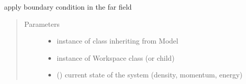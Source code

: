 \documentclass[letterpaper,10pt,english]{sphinxmanual}
\begin{document}
\begin{fulllineitems}
\begin{fulllineitems}
\begin{quote}
\begin{description}
\end{description}
\end{quote}

\end{fulllineitems}


\begin{fulllineitems}
\label{\detokenize{autoapi/BoundaryConditioner/index:BoundaryConditioner.BoundaryConditioner.bc_far}}
\sphinxAtStartPar
apply boundary condition in the far field
\begin{quote}\begin{description}
\item[{Parameters}] \leavevmode\begin{itemize}
\item {} 
\sphinxAtStartPar
{} \textendash{} instance of class inheriting from Model

\item {} 
\sphinxAtStartPar
{} \textendash{} instance of Workspace class (or child)

\item {} 
\sphinxAtStartPar
{} ({\hyperref[\detokenize{autoapi/Field/index:Field.Field}]{}}) \textendash{} current state of the system (density, momentum, energy)

\end{itemize}

\end{description}\end{quote}

\end{fulllineitems}



\end{fulllineitems}
\end{document}
